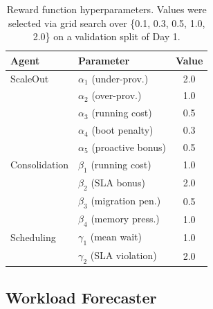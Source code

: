 \documentclass[conference]{IEEEtran}
\begin{document}
\begin{table}[h]
\centering
\caption{Reward function hyperparameters.  Values were selected via grid
search over \{0.1, 0.3, 0.5, 1.0, 2.0\} on a validation split of Day 1.}
\label{tab:reward_params}
\begin{tabular}{llc}
\toprule
\textbf{Agent} & \textbf{Parameter} & \textbf{Value} \\
\midrule
ScaleOut & $\alpha_1$ (under-prov.) & 2.0 \\
         & $\alpha_2$ (over-prov.) & 1.0 \\
         & $\alpha_3$ (running cost) & 0.5 \\
         & $\alpha_4$ (boot penalty) & 0.3 \\
         & $\alpha_5$ (proactive bonus) & 0.5 \\
\midrule
Consolidation & $\beta_1$ (running cost) & 1.0 \\
              & $\beta_2$ (SLA bonus) & 2.0 \\
              & $\beta_3$ (migration pen.) & 0.5 \\
              & $\beta_4$ (memory press.) & 1.0 \\
\midrule
Scheduling & $\gamma_1$ (mean wait) & 1.0 \\
           & $\gamma_2$ (SLA violation) & 2.0 \\
\bottomrule
\end{tabular}
\end{table}

\subsection{Workload Forecaster}
\end{document}
